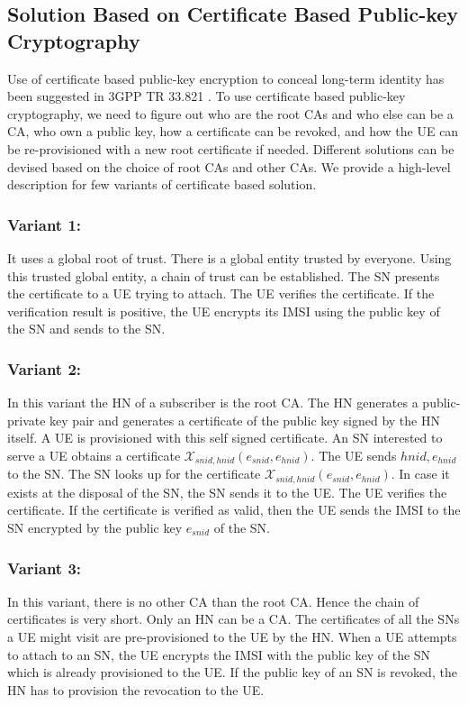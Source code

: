 \documentclass{river-journal}
\begin{document}
\subsection{Solution Based on Certificate Based Public-key Cryptography} 
\label{sub_sec:solution_certificate}
Use of certificate based public-key encryption to conceal long-term identity has been suggested in 3GPP TR 33.821 \cite{TR33821}. To use certificate based public-key cryptography, we need to figure out who are the root CAs and who else can be a CA, who own a public key, how a certificate can be revoked, and how the UE can be re-provisioned with a new root certificate if needed. Different solutions can be devised based on the choice of root CAs and other CAs. We provide a high-level description for few variants of certificate based solution.

\subsubsection{Variant 1:}
It uses a global root of trust. There is a global entity trusted by everyone. Using this trusted global entity, a chain of trust can be established. The SN presents the certificate to a UE trying to attach. The UE verifies the certificate. If the verification result is positive, the UE encrypts its IMSI using the public key of the SN and sends to the SN. 

\subsubsection{Variant 2:}
In this variant the HN of a subscriber is the root CA. The HN generates a public-private key pair and generates a certificate of the public key signed by the HN itself. A UE is provisioned with this self signed certificate. An SN interested to serve a UE obtains a certificate $\mathcal{X}_{snid,hnid} (e_{snid},e_{hnid})$. The UE sends $hnid,e_{hnid}$ to the SN. The SN looks up for the certificate $\mathcal{X}_{snid,hnid} (e_{snid},e_{hnid})$. In case it exists at the disposal of the SN, the SN sends it to the UE. The UE verifies the certificate. If the certificate is verified as valid, then the UE sends the IMSI to the SN encrypted by the public key $e_{snid}$ of the SN.

\subsubsection{Variant 3:}
In this variant, there is no other CA than the root CA. Hence the chain of certificates is very short. Only an HN can be a CA. The certificates of all the SNs a UE might visit are pre-provisioned to the UE by the HN. When a UE attempts to attach to an SN, the UE encrypts the IMSI with the public key of the SN which is already provisioned to the UE. If the public key of an SN is revoked, the HN has to provision the revocation to the UE.
\end{document}
